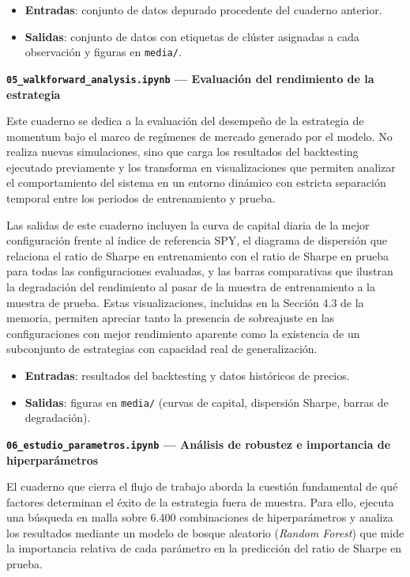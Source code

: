 \begin{itemize}
    \item \textbf{Entradas}: conjunto de datos depurado procedente del cuaderno anterior.
    \item \textbf{Salidas}: conjunto de datos con etiquetas de clúster asignadas a cada observación y figuras en \texttt{media/}.
\end{itemize}

\textbf{\texttt{05\_walkforward\_analysis.ipynb} --- Evaluación del rendimiento de la estrategia}

Este cuaderno se dedica a la evaluación del desempeño de la estrategia de momentum bajo el marco de regímenes de mercado generado por el modelo. No realiza nuevas simulaciones, sino que carga los resultados del backtesting ejecutado previamente y los transforma en visualizaciones que permiten analizar el comportamiento del sistema en un entorno dinámico con estricta separación temporal entre los periodos de entrenamiento y prueba.

Las salidas de este cuaderno incluyen la curva de capital diaria de la mejor configuración frente al índice de referencia SPY, el diagrama de dispersión que relaciona el ratio de Sharpe en entrenamiento con el ratio de Sharpe en prueba para todas las configuraciones evaluadas, y las barras comparativas que ilustran la degradación del rendimiento al pasar de la muestra de entrenamiento a la muestra de prueba. Estas visualizaciones, incluidas en la Sección 4.3 de la memoria, permiten apreciar tanto la presencia de sobreajuste en las configuraciones con mejor rendimiento aparente como la existencia de un subconjunto de estrategias con capacidad real de generalización.

\begin{itemize}
    \item \textbf{Entradas}: resultados del backtesting y datos históricos de precios.
    \item \textbf{Salidas}: figuras en \texttt{media/} (curvas de capital, dispersión Sharpe, barras de degradación).
\end{itemize}

\textbf{\texttt{06\_estudio\_parametros.ipynb} --- Análisis de robustez e importancia de hiperparámetros}

El cuaderno que cierra el flujo de trabajo aborda la cuestión fundamental de qué factores determinan el éxito de la estrategia fuera de muestra. Para ello, ejecuta una búsqueda en malla sobre 6.400 combinaciones de hiperparámetros y analiza los resultados mediante un modelo de bosque aleatorio (\textit{Random Forest}) que mide la importancia relativa de cada parámetro en la predicción del ratio de Sharpe en prueba.

